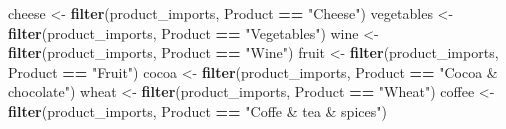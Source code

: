 \documentclass[]{article}
\newenvironment{Shaded}{\begin{snugshade}}{\end{snugshade}}
\newcommand{\KeywordTok}[1]{\textcolor[rgb]{0.13,0.29,0.53}{\textbf{#1}}}
\newcommand{\StringTok}[1]{\textcolor[rgb]{0.31,0.60,0.02}{#1}}
\newcommand{\OperatorTok}[1]{\textcolor[rgb]{0.81,0.36,0.00}{\textbf{#1}}}
\newcommand{\NormalTok}[1]{#1}
\begin{document}
\begin{Shaded}
\begin{Highlighting}[]
\NormalTok{cheese <-}\StringTok{ }\KeywordTok{filter}\NormalTok{(product_imports, Product }\OperatorTok{==}\StringTok{ "Cheese"}\NormalTok{)}
\NormalTok{vegetables <-}\StringTok{ }\KeywordTok{filter}\NormalTok{(product_imports, Product }\OperatorTok{==}\StringTok{ "Vegetables"}\NormalTok{)}
\NormalTok{wine <-}\StringTok{ }\KeywordTok{filter}\NormalTok{(product_imports, Product }\OperatorTok{==}\StringTok{ "Wine"}\NormalTok{)}
\NormalTok{fruit <-}\StringTok{ }\KeywordTok{filter}\NormalTok{(product_imports, Product }\OperatorTok{==}\StringTok{ "Fruit"}\NormalTok{)}
\NormalTok{cocoa <-}\StringTok{ }\KeywordTok{filter}\NormalTok{(product_imports, Product }\OperatorTok{==}\StringTok{ "Cocoa & chocolate"}\NormalTok{)}
\NormalTok{wheat <-}\StringTok{ }\KeywordTok{filter}\NormalTok{(product_imports, Product }\OperatorTok{==}\StringTok{ "Wheat"}\NormalTok{)}
\NormalTok{coffee <-}\StringTok{ }\KeywordTok{filter}\NormalTok{(product_imports, Product }\OperatorTok{==}\StringTok{ "Coffe & tea & spices"}\NormalTok{)}
\end{Highlighting}
\end{Shaded}
\end{document}
